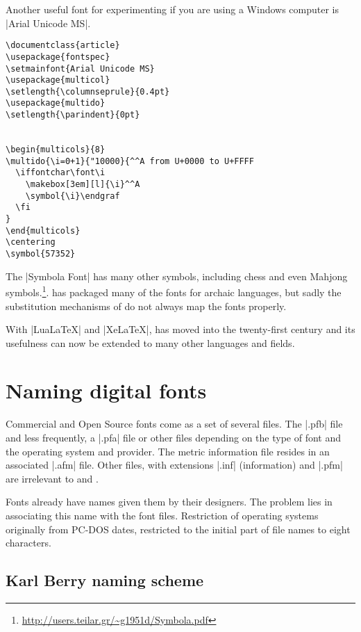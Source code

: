 Another useful font for experimenting if you are using a Windows computer is |Arial Unicode MS|.

\begin{verbatim}
\documentclass{article}
\usepackage{fontspec}
\setmainfont{Arial Unicode MS}
\usepackage{multicol}
\setlength{\columnseprule}{0.4pt}
\usepackage{multido}
\setlength{\parindent}{0pt}


\begin{multicols}{8}
\multido{\i=0+1}{"10000}{^^A from U+0000 to U+FFFF
  \iffontchar\font\i
    \makebox[3em][l]{\i}^^A
    \symbol{\i}\endgraf
  \fi
}
\end{multicols}
\centering
\symbol{57352}

\end{verbatim} 

The |Symbola Font| has many other symbols, including chess and even Mahjong symbols.\footnote{\url{http://users.teilar.gr/~g1951d/Symbola.pdf}}.  has packaged many of the fonts for archaic languages, but sadly the substitution mechanisms of \latexe do not always map the fonts properly.

With |LuaLaTeX| and |XeLaTeX|, \tex has moved into the twenty-first century and its usefulness can now be extended to many other languages and fields. 

\section{Naming digital fonts}

Commercial and Open Source fonts come as a set of several files. The |.pfb| file and less frequently, a |.pfa| file or other files depending on the type of font and the operating system and provider. The metric information file resides in an associated |.afm| file. Other files, with extensions |.inf| (information) and |.pfm| are irrelevant to \latex and \tex.

Fonts already have names given them by their designers. The problem lies in associating this name with the font files. Restriction of operating systems originally from PC-DOS dates, restricted to the initial part of file names to eight characters.

\subsection{Karl Berry naming scheme}

